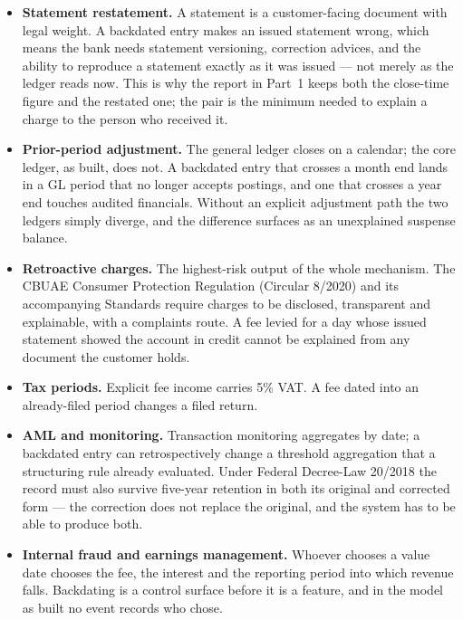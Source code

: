 \documentclass[10pt,a4paper]{article}
\begin{document}
\begin{itemize}
  \item \textbf{Statement restatement.} A statement is a customer-facing
        document with legal weight. A backdated entry makes an issued statement
        wrong, which means the bank needs statement versioning, correction
        advices, and the ability to reproduce a statement exactly as it was
        issued --- not merely as the ledger reads now. This is why the report
        in Part~1 keeps both the close-time figure and the restated one; the
        pair is the minimum needed to explain a charge to the person who
        received it.
  \item \textbf{Prior-period adjustment.} The general ledger closes on a
        calendar; the core ledger, as built, does not. A backdated entry that
        crosses a month end lands in a GL period that no longer accepts
        postings, and one that crosses a year end touches audited financials.
        Without an explicit adjustment path the two ledgers simply diverge, and
        the difference surfaces as an unexplained suspense balance.
  \item \textbf{Retroactive charges.} The highest-risk output of the whole
        mechanism. The CBUAE Consumer Protection Regulation (Circular 8/2020)
        and its accompanying Standards require charges to be disclosed,
        transparent and explainable, with a complaints route. A fee levied for
        a day whose issued statement showed the account in credit cannot be
        explained from any document the customer holds.
  \item \textbf{Tax periods.} Explicit fee income carries 5\% VAT. A fee dated
        into an already-filed period changes a filed return.
  \item \textbf{AML and monitoring.} Transaction monitoring aggregates by date;
        a backdated entry can retrospectively change a threshold aggregation
        that a structuring rule already evaluated. Under Federal Decree-Law
        20/2018 the record must also survive five-year retention in both its
        original and corrected form --- the correction does not replace the
        original, and the system has to be able to produce both.
  \item \textbf{Internal fraud and earnings management.} Whoever chooses a
        value date chooses the fee, the interest and the reporting period into
        which revenue falls. Backdating is a control surface before it is a
        feature, and in the model as built no event records who chose.
\end{itemize}
\end{document}
